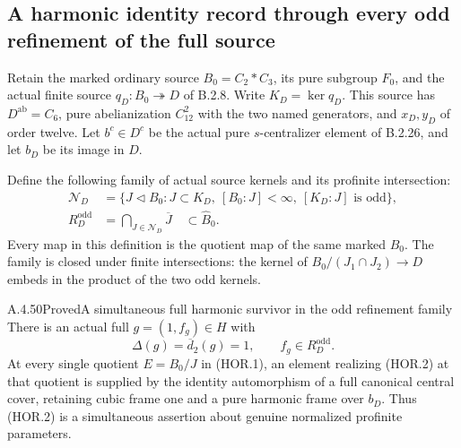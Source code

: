 \subsection{A harmonic identity record through every odd refinement of the full source}

Retain the marked ordinary source $B_0=C_2*C_3$, its
pure subgroup $F_0$, and the actual finite source
$q_D:B_0\twoheadrightarrow D$ of B.2.8.  Write
$K_D=\ker q_D$.  This source has
$D^{\mathrm{ab}}=C_6$, pure abelianization $C_{12}^2$
with the two named generators, and $x_D,y_D$ of
order twelve.  Let $b^c\in D^c$ be the actual pure
$s$-centralizer element of B.2.26, and let $b_D$ be
its image in $D$.

Define the following family of actual source kernels
and its profinite intersection:
\[
 \begin{split}
 \mathcal N_D
   &=\{J\triangleleft B_0:J\subset K_D,
          \ [B_0:J]<\infty,\ [K_D:J]\text{ is odd}\},\\
 R_D^{\mathrm{odd}}
   &=\bigcap_{J\in\mathcal N_D}\overline J
                         \quad\subset\widehat B_0.
 \end{split}                                             \tag{HOR.1}
\]
Every map in this definition is the quotient map of
the same marked $B_0$.  The family is closed under
finite intersections: the kernel of
$B_0/(J_1\cap J_2)\to D$ embeds in the product of
the two odd kernels.

\begin{result}{A.4.50}{Proved}{A simultaneous full harmonic survivor in the odd refinement family}
There is an actual full $g=(1,f_g)\in H$ with
\[
 \Delta(g)=\overline d_2(g)=1,
             \qquad f_g\in R_D^{\mathrm{odd}}.
 \tag{HOR.2}
\]
At every single quotient $E=B_0/J$ in (HOR.1), an
element realizing (HOR.2) at that quotient is supplied
by the identity automorphism of a full canonical
central cover, retaining cubic frame one and a pure
harmonic frame over $b_D$.  Thus (HOR.2) is a
simultaneous assertion about genuine normalized
profinite parameters.
\end{result}

